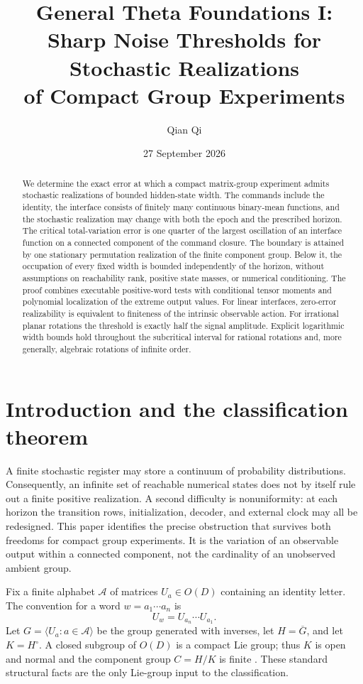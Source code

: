 \documentclass[11pt]{amsart}
\title[Sharp noise thresholds for stochastic realizations]{General Theta Foundations I:\\Sharp Noise Thresholds for Stochastic Realizations\\of Compact Group Experiments}
\author{Qian Qi}
\date{27 September 2026}
\numberwithin{equation}{section}
\theoremstyle{definition}
\theoremstyle{remark}
\begin{document}
\begin{abstract}
We determine the exact error at which a compact matrix-group experiment admits stochastic realizations of bounded hidden-state width. The commands include the identity, the interface consists of finitely many continuous binary-mean functions, and the stochastic realization may change with both the epoch and the prescribed horizon. The critical total-variation error is one quarter of the largest oscillation of an interface function on a connected component of the command closure. The boundary is attained by one stationary permutation realization of the finite component group. Below it, the occupation of every fixed width is bounded independently of the horizon, without assumptions on reachability rank, positive state masses, or numerical conditioning. The proof combines executable positive-word tests with conditional tensor moments and polynomial localization of the extreme output values. For linear interfaces, zero-error realizability is equivalent to finiteness of the intrinsic observable action. For irrational planar rotations the threshold is exactly half the signal amplitude. Explicit logarithmic width bounds hold throughout the subcritical interval for rational rotations and, more generally, algebraic rotations of infinite order.
\end{abstract}
\maketitle

\section{Introduction and the classification theorem}\label{sec:intro53}
A finite stochastic register may store a continuum of probability distributions. Consequently, an infinite set of reachable numerical states does not by itself rule out a finite positive realization. A second difficulty is nonuniformity: at each horizon the transition rows, initialization, decoder, and external clock may all be redesigned. This paper identifies the precise obstruction that survives both freedoms for compact group experiments. It is the variation of an observable output within a connected component, not the cardinality of an unobserved ambient group.

Fix a finite alphabet $\mathcal A$ of matrices $U_a\in O(D)$ containing an identity letter. The convention for a word $w=a_1\cdots a_n$ is
\[
 U_w=U_{a_n}\cdots U_{a_1}.
\]
Let $G=\langle U_a:a\in\mathcal A\rangle$ be the group generated with inverses, let $H=\overline G$, and let $K=H^\circ$. A closed subgroup of $O(D)$ is a compact Lie group; thus $K$ is open and normal and the component group $C=H/K$ is finite \cite{Hall}. These standard structural facts are the only Lie-group input to the classification.
\end{document}
